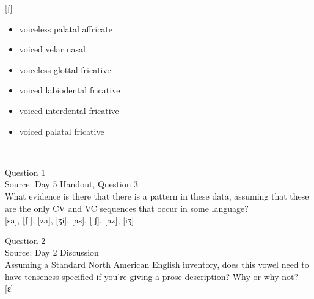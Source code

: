 \documentclass[12pt]{article}
\begin{document}
{[ʃ]}

\begin{itemize} \item voiceless palatal affricate \item voiced velar nasal \item voiceless glottal fricative \item voiced labiodental fricative \item voiced interdental fricative \item voiced palatal fricative \end{itemize}


\newpage

\begin{center}
\textbf{{\color{red}{\HUGE END OF EXAM}}}\\

\end{center}
\newpage

\begin{center}
\textbf{{\color{blue}{\HUGE START OF EXAM\\}}}

\textbf{{\color{blue}{\HUGE Student ID: 6801\\}}}

\textbf{{\color{blue}{\HUGE 2:30 - 2:45 PM\\}}}

\end{center}
\newpage

{\large Question 1}\\

Source: Day 5 Handout, Question 3\\

What evidence is there that there is a pattern in these data, assuming that these are the only CV and VC sequences that occur in some language?\\

{[sa]}, {[ʃi]}, {[za]}, {[ʒi]}, {[as]}, {[iʃ]}, {[az]}, {[iʒ]}


\newpage

{\large Question 2}\\

Source: Day 2 Discussion\\

Assuming a Standard North American English inventory, does this vowel need to have tenseness specified if you're giving a prose description? Why or why not?\\

{[ɛ]}
\end{document}
